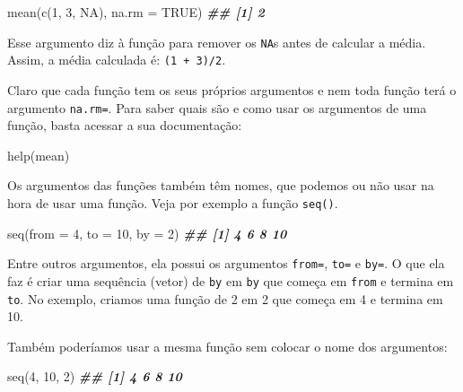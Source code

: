 \documentclass[
]{book}
\newenvironment{Shaded}{\begin{snugshade}}{\end{snugshade}}
\newcommand{\AttributeTok}[1]{\textcolor[rgb]{0.77,0.63,0.00}{#1}}
\newcommand{\ConstantTok}[1]{\textcolor[rgb]{0.00,0.00,0.00}{#1}}
\newcommand{\DecValTok}[1]{\textcolor[rgb]{0.00,0.00,0.81}{#1}}
\newcommand{\DocumentationTok}[1]{\textcolor[rgb]{0.56,0.35,0.01}{\textbf{\textit{#1}}}}
\newcommand{\FunctionTok}[1]{\textcolor[rgb]{0.00,0.00,0.00}{#1}}
\newcommand{\NormalTok}[1]{#1}
\begin{document}
\begin{Shaded}
\begin{Highlighting}[]
\FunctionTok{mean}\NormalTok{(}\FunctionTok{c}\NormalTok{(}\DecValTok{1}\NormalTok{, }\DecValTok{3}\NormalTok{, }\ConstantTok{NA}\NormalTok{), }\AttributeTok{na.rm =} \ConstantTok{TRUE}\NormalTok{)}
\DocumentationTok{\#\# [1] 2}
\end{Highlighting}
\end{Shaded}

Esse argumento diz à função para remover os \texttt{NA}s antes de calcular a média. Assim, a média calculada é: \texttt{(1\ +\ 3)/2}.

Claro que cada função tem os seus próprios argumentos e nem toda função terá o argumento \texttt{na.rm=}. Para saber quais são e como usar os argumentos de uma função, basta acessar a sua documentação:

\begin{Shaded}
\begin{Highlighting}[]
\FunctionTok{help}\NormalTok{(mean)}
\end{Highlighting}
\end{Shaded}

Os argumentos das funções também têm nomes, que podemos ou não usar na hora de usar uma função. Veja por exemplo a função \texttt{seq()}.

\begin{Shaded}
\begin{Highlighting}[]
\FunctionTok{seq}\NormalTok{(}\AttributeTok{from =} \DecValTok{4}\NormalTok{, }\AttributeTok{to =} \DecValTok{10}\NormalTok{, }\AttributeTok{by =} \DecValTok{2}\NormalTok{)}
\DocumentationTok{\#\# [1]  4  6  8 10}
\end{Highlighting}
\end{Shaded}

Entre outros argumentos, ela possui os argumentos \texttt{from=}, \texttt{to=} e \texttt{by=}. O que ela faz é criar uma sequência (vetor) de \texttt{by} em \texttt{by} que começa em \texttt{from} e termina em \texttt{to}. No exemplo, criamos uma função de 2 em 2 que começa em 4 e termina em 10.

Também poderíamos usar a mesma função sem colocar o nome dos argumentos:

\begin{Shaded}
\begin{Highlighting}[]
\FunctionTok{seq}\NormalTok{(}\DecValTok{4}\NormalTok{, }\DecValTok{10}\NormalTok{, }\DecValTok{2}\NormalTok{)}
\DocumentationTok{\#\# [1]  4  6  8 10}
\end{Highlighting}
\end{Shaded}
\end{document}
